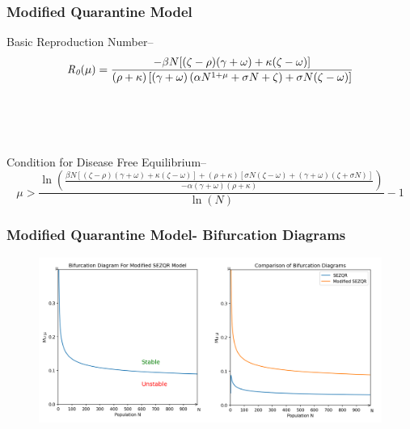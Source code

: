 \documentclass{beamer}
\begin{document}
\begin{frame}
\frametitle{Modified Quarantine Model}

Basic Reproduction Number-- 
\begin{equation*}
\textit{R\textsubscript{0}}(\mu) = \frac{-\beta N[(\zeta-\rho)(\gamma+\omega)+\kappa(\zeta-\omega)]}{(\rho+\kappa)\left[(\gamma+\omega)\left(\alpha N^{1+\mu}+\sigma N+\zeta\right)+\sigma N(\zeta-\omega)\right]}
\end{equation*} \\
~\\
~\\
~\\
Condition for Disease Free Equilibrium--
\begin{equation*}
\mu>\frac{\ln \left(\frac{\beta N[(\zeta-\rho)(\gamma+\omega)+\kappa(\zeta-\omega)]+(\rho+\kappa)[\sigma N(\zeta-\omega)+(\gamma+\omega)(\zeta+\sigma N)]}{-\alpha(\gamma+\omega)(\rho+\kappa)}\right)}{\ln (N)}-1
\end{equation*}
\end{frame}



\begin{frame}
\begin{adjustwidth}{-1.7em}{-1.5em}
\frametitle{Modified Quarantine Model- Bifurcation Diagrams}

\begin{figure}[H]
\centering
\includegraphics[scale=0.45]{SEZQR_3.png}
\label{fig:SEZQR Model 01}
\end{figure}
\end{adjustwidth}
\end{frame}
\end{document}
